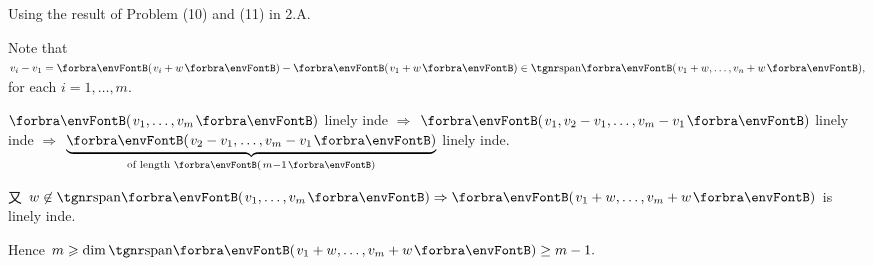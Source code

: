 \documentclass[a4paper, 11pt, UTF8]{article}
\begin{document}
\begin{large}
\SepLine


Using the result of Problem (10) and (11) in 2.A.\par\quad
Note that $v_i-v_1=\Par{v_i+w}-\Par{v_1+w}\in\Span{v_1+w,\dots,v_n+w},$ for each $i=1,\dots,m$.\par\quad
$\Par{v_1,\dots,v_m}$ linely inde $\Rightarrow$ $\Par{v_1,v_2-v_1,\dots,v_m-v_1}$ linely inde $\Rightarrow$ $\underbrace{\Par{v_2-v_1,_{}\dots,v_m-v_1}}_{\text{of length }\Par{m-1}}$ linely inde.\vspace{-8pt}\par\quad
又 $w\not\in\Span{v_1,\dots,v_m}\Rightarrow\Par{v_1+w,\dots,v_m+w}$ is linely inde.\par\quad
Hence $m\geqslant\dim\Span{v_1+w,\dots,v_m+w}\geq m-1.$\PfEnd
\SepLine


\end{large}
\end{document}
